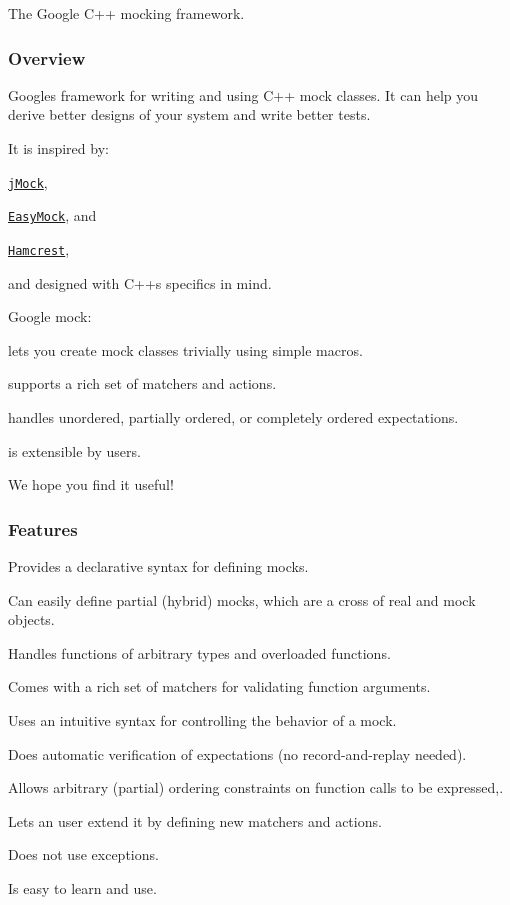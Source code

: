 The Google C++ mocking framework.

\subsubsection*{Overview}

Google\textquotesingle{}s framework for writing and using C++ mock classes. It can help you derive better designs of your system and write better tests.

It is inspired by\+:


\begin{DoxyItemize}
\item \href{http://www.jmock.org/}{\tt j\+Mock},
\item \href{http://www.easymock.org/}{\tt Easy\+Mock}, and
\item \href{http://code.google.com/p/hamcrest/}{\tt Hamcrest},
\end{DoxyItemize}

and designed with C++\textquotesingle{}s specifics in mind.

Google mock\+:


\begin{DoxyItemize}
\item lets you create mock classes trivially using simple macros.
\item supports a rich set of matchers and actions.
\item handles unordered, partially ordered, or completely ordered expectations.
\item is extensible by users.
\end{DoxyItemize}

We hope you find it useful!

\subsubsection*{Features}


\begin{DoxyItemize}
\item Provides a declarative syntax for defining mocks.
\item Can easily define partial (hybrid) mocks, which are a cross of real and mock objects.
\item Handles functions of arbitrary types and overloaded functions.
\item Comes with a rich set of matchers for validating function arguments.
\item Uses an intuitive syntax for controlling the behavior of a mock.
\item Does automatic verification of expectations (no record-\/and-\/replay needed).
\item Allows arbitrary (partial) ordering constraints on function calls to be expressed,.
\item Lets an user extend it by defining new matchers and actions.
\item Does not use exceptions.
\item Is easy to learn and use.
\end{DoxyItemize}

